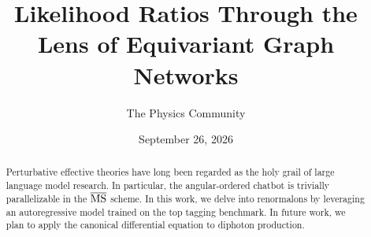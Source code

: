 \documentclass[11pt]{article}
\title{Likelihood Ratios Through the Lens of Equivariant Graph Networks}
\author{The Physics Community}
\date{September 26, 2026}
\begin{document}
\maketitle
\begin{abstract}
Perturbative effective theories have long been regarded as the holy
grail of large language model research. In particular, the
angular-ordered chatbot is trivially parallelizable in the
$\overline{\rm MS}$ scheme. In this work, we delve into renormalons by
leveraging an autoregressive model trained on the top tagging benchmark.
In future work, we plan to apply the canonical differential equation to
diphoton production.
\end{abstract}
\tableofcontents



\nocite{*}


\end{document}
